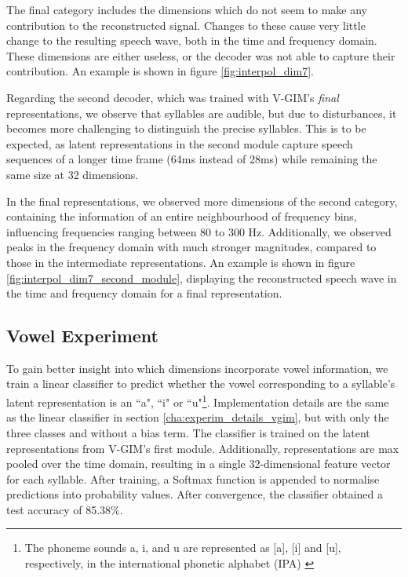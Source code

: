 		The final category includes the dimensions which do not seem to make any contribution to the reconstructed signal. Changes to these cause very little change to the resulting speech wave, both in the time and frequency domain. These dimensions are either useless, or the decoder was not able to capture their contribution. An example is shown in figure \ref{fig:interpol_dim7}.
		
		Regarding the second decoder, which was trained with V-GIM's \textit{final} representations, we observe that syllables are audible, but due to disturbances, it becomes more challenging to distinguish the precise syllables. This is to be expected, as latent representations in the second module capture speech sequences of a longer time frame (64ms instead of 28ms) while remaining the same size at 32 dimensions.
		
		In the final representations, we observed more dimensions of the second category, containing the information of an entire neighbourhood of frequency bins, influencing frequencies ranging between 80 to 300 Hz. Additionally, we observed peaks in the frequency domain with much stronger magnitudes, compared to those in the intermediate representations. An example is shown in figure \ref{fig:interpol_dim7_second_module}, displaying the reconstructed speech wave in the time and frequency domain for a final representation.
		
		
	
	\subsection{Vowel Experiment}
		To gain better insight into which dimensions incorporate vowel information, we train a linear classifier to predict whether the vowel corresponding to a syllable's latent representation is an ``a", ``i" or  ``u"\footnote{The phoneme sounds a, i, and u are represented as [a], [i] and [u], respectively, in the international phonetic alphabet (IPA) \citep{teachwonderfulLetExploreInternational2021}}. Implementation details are the same as the linear classifier in section \ref{cha:experim_details_vgim}, but with only the three classes and without a bias term. The classifier is trained on the latent representations from V-GIM's first module. Additionally, representations are max pooled over the time domain, resulting in a single 32-dimensional feature vector for each syllable. After training, a Softmax function is appended to normalise predictions into probability values. After convergence, the classifier obtained a test accuracy of 85.38\%.
		
